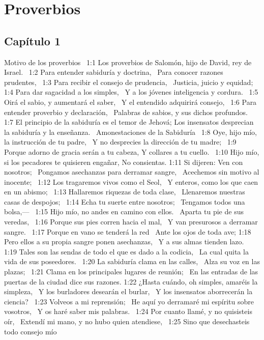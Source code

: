 \chapter{Proverbios}

\section*{Capítulo 1}
Motivo de los proverbios  
1:1 Los proverbios de Salomón, hijo de David, rey de Israel.  
1:2 Para entender sabiduría y doctrina,  
Para conocer razones prudentes,  
1:3 Para recibir el consejo de prudencia,  
Justicia, juicio y equidad;  
1:4 Para dar sagacidad a los simples,  
Y a los jóvenes inteligencia y cordura.  
1:5 Oirá el sabio, y aumentará el saber,  
Y el entendido adquirirá consejo,  
1:6 Para entender proverbio y declaración,  
Palabras de sabios, y sus dichos profundos.  
1:7 El principio de la sabiduría es el temor de Jehová; 
Los insensatos desprecian la sabiduría y la enseñanza.  
Amonestaciones de la Sabiduría  
1:8 Oye, hijo mío, la instrucción de tu padre,  
Y no desprecies la dirección de tu madre;  
1:9 Porque adorno de gracia serán a tu cabeza, 
Y collares a tu cuello.  
1:10 Hijo mío, si los pecadores te quisieren engañar, 
No consientas. 
1:11 Si dijeren: Ven con nosotros;  
Pongamos asechanzas para derramar sangre,  
Acechemos sin motivo al inocente;  
1:12 Los tragaremos vivos como el Seol,  
Y enteros, como los que caen en un abismo;  
1:13 Hallaremos riquezas de toda clase,  
Llenaremos nuestras casas de despojos;  
1:14 Echa tu suerte entre nosotros;  
Tengamos todos una bolsa,—  
1:15 Hijo mío, no andes en camino con ellos.  
Aparta tu pie de sus veredas,  
1:16 Porque sus pies corren hacia el mal,  
Y van presurosos a derramar sangre.  
1:17 Porque en vano se tenderá la red  
Ante los ojos de toda ave; 
1:18 Pero ellos a su propia sangre ponen asechanzas,  
Y a sus almas tienden lazo.  
1:19 Tales son las sendas de todo el que es dado a la codicia,  
La cual quita la vida de sus poseedores.  
1:20 La sabiduría clama en las calles,  
Alza su voz en las plazas;  
1:21 Clama en los principales lugares de reunión;  
En las entradas de las puertas de la ciudad dice sus razones. 
1:22 ¿Hasta cuándo, oh simples, amaréis la simpleza,  
Y los burladores desearán el burlar,  
Y los insensatos aborrecerán la ciencia?  
1:23 Volveos a mi reprensión;  
He aquí yo derramaré mi espíritu sobre vosotros,  
Y os haré saber mis palabras.  
1:24 Por cuanto llamé, y no quisisteis oír,  
Extendí mi mano, y no hubo quien atendiese,  
1:25 Sino que desechasteis todo consejo mío  
